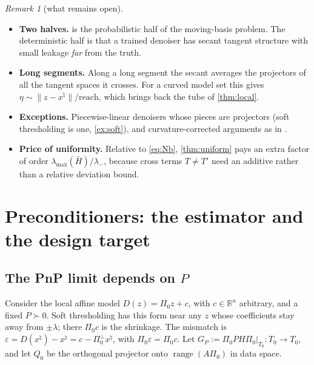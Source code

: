 \documentclass[11pt]{article}
\theoremstyle{definition}
\theoremstyle{remark}
\newtheorem{remark}[theorem]{Remark}
\newcommand{\RR}{\mathbb R}
\newcommand{\norm}[1]{\lVert #1\rVert}
\newcommand{\range}{\operatorname{range}}
\newcommand{\lmax}{\lambda_{\max}}
\newcommand{\Hb}{\bar H}
\newcommand{\xt}{x^\natural}
\begin{document}
\begin{remark}[what remains open]\label{rem:open}
\begin{itemize}
\item \textbf{Two halves.}  is the probabilistic half of the moving-basis problem. The
  deterministic half is that a trained denoiser has secant tangent structure with small leakage \emph{far} from
  the truth.
\item \textbf{Long segments.} Along a long segment the secant averages the projectors of all the tangent spaces it
  crosses. For a curved model set this gives $\eta\sim\norm{z-\xt}/\mathrm{reach}$, which brings back the tube of
  \cref{thm:local}.
\item \textbf{Exceptions.} Piecewise-linear denoisers whose pieces are projectors (soft thresholding is one,
  \cref{ex:soft}), and curvature-corrected arguments as in \cite{wei2016riemannian}.
\item \textbf{Price of uniformity.} Relative to \eqref{eq:Nb}, \cref{thm:uniform} pays an extra factor of order
  $\lmax(\Hb)/\lambda_-$, because cross terms $T\neq T'$ need an additive rather than a relative deviation
  bound.
\end{itemize}
\end{remark}

\section{Preconditioners: the estimator and the design target}\label{sec:precond}

\subsection{The PnP limit depends on $P$}

Consider the local affine model $D(z)=\Pi_0z+c$, with $c\in\RR^n$ arbitrary, and a fixed $P\succ0$. Soft
thresholding has this form near any $z$ whose coefficients stay away from $\pm\lambda$; there $\Pi_0c$ is the
shrinkage. The mismatch is $\varepsilon=D(\xt)-\xt=c-\Pi_0^\perp\xt$, with $\Pi_0\varepsilon=\Pi_0c$. Let
$G_P:=\Pi_0PH\Pi_0|_{T_0}:T_0\to T_0$, and let $Q_0$ be the orthogonal projector onto $\range(A\Pi_0)$ in data
space.
\end{document}
